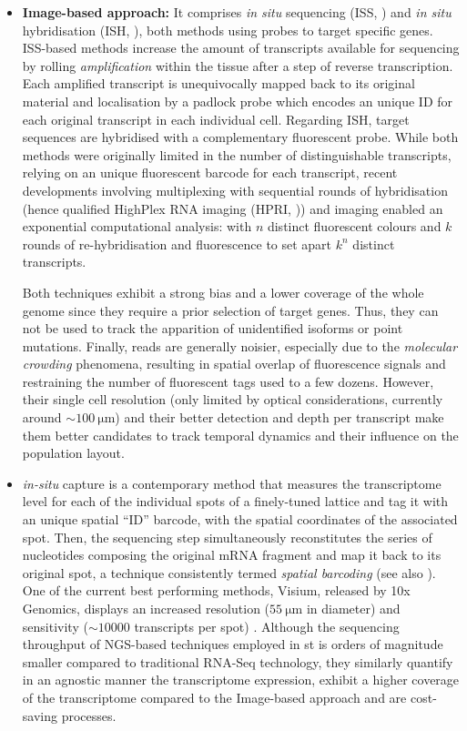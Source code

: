 \begin{itemize}
  \item \textbf{Image-based approach:} It comprises \emph{in situ} sequencing (ISS, \autocite{yokota_etal20}) and \emph{in situ} hybridisation (ISH, \autocite{vickovic_etal19}), both methods using probes to target specific genes. 
  ISS-based methods increase the amount of transcripts available for sequencing by rolling \emph{amplification} within the tissue after a step of reverse transcription. Each amplified transcript is unequivocally mapped back to its original material and localisation by a padlock probe which encodes an unique ID for each original transcript in each individual cell. Regarding ISH, target sequences are hybridised with a complementary fluorescent probe. 
  While both methods were originally limited in the number of distinguishable transcripts, relying on an unique fluorescent barcode for each transcript, recent developments involving multiplexing with sequential rounds of hybridisation (hence qualified HighPlex RNA imaging (HPRI, \autocite{he_etal22})) and imaging enabled an exponential  computational analysis: with $n$ distinct fluorescent colours and $k$ rounds of re-hybridisation and fluorescence to set apart $k^n$ distinct transcripts.
  
    Both techniques exhibit a strong bias and a lower coverage of the whole genome since they require a prior selection of target genes. Thus, they can not be used to track the apparition of unidentified isoforms or point mutations.  Finally, reads are generally noisier, especially due to the \emph{molecular crowding} phenomena, resulting in spatial overlap of fluorescence signals and restraining the number of fluorescent tags used to a few dozens. However, their single cell resolution (only limited by optical considerations, currently around $\sim \SI{100}{\micro \metre}$) and their better detection and depth per transcript make them better candidates to track temporal dynamics and their influence on the population layout. 
    
    \item \emph{in-situ} capture is a contemporary method that measures the transcriptome level for each of the individual spots of a finely-tuned lattice and tag it with an unique spatial \enquote{ID} barcode, with the spatial coordinates of the associated spot. Then, the sequencing step simultaneously reconstitutes the series of nucleotides composing the original mRNA fragment and map it back to its original spot, a technique consistently termed \emph{spatial barcoding} (see also ). One of the current best performing methods, Visium, released by 10x Genomics, displays an increased resolution ($\SI{55}{\micro \metre}$ in diameter) and sensitivity ($\sim \num{10000}$ transcripts per spot) \autocite{nikhilrao_etal20}. 
    Although the sequencing throughput of NGS-based techniques employed in \acrshort{st} is orders of magnitude smaller compared to traditional \acrshort{RNA-Seq} technology, they similarly quantify in an agnostic manner the transcriptome expression, exhibit a higher coverage of the transcriptome compared to the Image-based approach and are cost-saving processes. 
    

\end{itemize}
